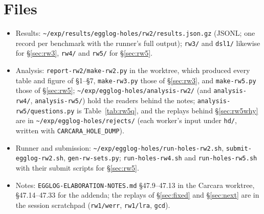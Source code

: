 \documentclass[11pt,a4paper]{article}
\newcommand{\code}[1]{\texttt{#1}}
\begin{document}
\section{Files}
\begin{itemize}
  \item Results: \code{\textasciitilde/exp/results/egglog-holes/rw2/results.json.gz}
    (JSONL; one record per benchmark with the runner's full output);
    \code{rw3/} and \code{dsl1/} likewise for \S\ref{sec:rw3}, \code{rw4/}
    and \code{rw5/} for \S\ref{sec:rw5}.
  \item Analysis: \code{report-rw2/make-rw2.py} in the worktree, which
    produced every table and figure of \S1--\S7, \code{make-rw3.py}
    those of \S\ref{sec:rw3}, and \code{make-rw5.py} those of
    \S\ref{sec:rw5};
    \code{\textasciitilde/exp/egglog-holes/analysis-rw2/} (and
    \code{analysis-rw4/}, \code{analysis-rw5/}) hold the readers behind the
    notes; \code{analysis-rw5/questions.py} is Table~\ref{tab:rw5q}, and
    the replays behind \S\ref{sec:rw5why} are in
    \code{\textasciitilde/exp/egglog-holes/rejects/} (each worker's input
    under \code{hd/}, written with \code{CARCARA\_HOLE\_DUMP}).
  \item Runner and submission: \code{\textasciitilde/exp/egglog-holes/run-holes-rw2.sh},
    \code{submit-egglog-rw2.sh}, \code{gen-rw-sets.py}; \code{run-holes-rw4.sh}
    and \code{run-holes-rw5.sh} with their submit scripts for \S\ref{sec:rw5}.
  \item Notes: \code{EGGLOG-ELABORATION-NOTES.md} \S47.9--47.13 in the
    Carcara worktree, \S47.14--47.33 for the addenda; the replays of
    \S\ref{sec:fixed} and
    \S\ref{sec:next} are in the session scratchpad
    (\code{rw1/werr}, \code{rw1/lra}, \code{gcd}).
\end{itemize}
\end{document}
